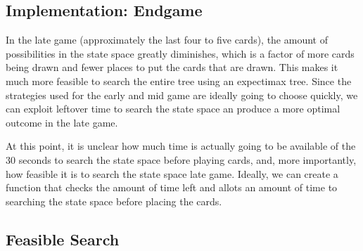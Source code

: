 \documentclass[twoside]{article}
\begin{document}
\begin{multicols}{2}

\section{Implementation: Endgame}

In the late game (approximately the last four to five cards), the amount of possibilities in the state space greatly diminishes, which is a factor of more cards being drawn and fewer places to put the cards that are drawn. This makes it much more feasible to search the entire tree using an expectimax tree. Since the strategies used for the early and mid game are ideally going to choose quickly, we can exploit leftover time to search the state space an produce a more optimal outcome in the late game.

At this point, it is unclear how much time is actually going to be available of the 30 seconds to search the state space before playing cards, and, more importantly, how feasible it is to search the state space late game. Ideally, we can create a function that checks the amount of time left and allots an amount of time to searching the state space before placing the cards.

\subsection{Feasible Search}



\begin{thebibliography}{99} %


\end{thebibliography}


\end{multicols}
\end{document}
